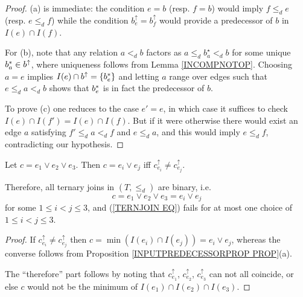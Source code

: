 \documentclass[a4paper,10pt]{article}%
\begin{document}
\begin{proof}
(a) is immediate: the condition $e = b$ (resp. $f = b$) would imply $f \leq_d e$ (resp. $e \leq_d f$)
while the condition $b^{\uparrow}_e = b^{\uparrow}_f$ would provide a predecessor of $b$ in $I(e) \cap I(f)$. 

For (b), note that any relation $a <_d b$ factors as 
$a \leq_d b^{\star}_a <_d b$ for some unique $b^{\**}_a \in b^{\uparrow}$, where uniqueness follows from Lemma \ref{INCOMPNOTOP}. Choosing $a=e$ implies $I(e) \cap b^{\uparrow} = \{b^{\**}_e\}$ and letting $a$ range over edges such that $e \leq_d a <_d b$ shows that $b^{\**}_e$ is in fact the predecessor of $b$.

To prove (c) one reduces to the case $e'=e$, in which case it suffices to check $I(e) \cap I(f') = I(e) \cap I(f)$. But if it were otherwise there would exist an edge $a$ satisfying
$f' \leq_d a <_d f$ and $e \leq_d a$, and this would imply $e \leq_d f$, contradicting our hypothesis.
\end{proof}


\begin{proposition}
\label{TERNARYJOIN PROP}
Let $c = e_1 \vee e_2 \vee e_3$.
Then $c = e_i \vee e_j$ iff $c^{\uparrow}_{e_i} \neq c^{\uparrow}_{e_j}$.

Therefore, all ternary joins in $(T,\leq_d)$ are binary, i.e.
\begin{equation}\label{TERNJOIN EQ}
	c = e_1 \vee e_2 \vee e_3 = e_i \vee e_j
\end{equation}
for some $1\leq i <j \leq 3$, and
(\ref{TERNJOIN EQ}) fails for 
 at most one choice of $1\leq i <j \leq 3$.
\end{proposition}


\begin{proof}
If $c^{\uparrow}_{e_i} \neq c^{\uparrow}_{e_j}$ then
$c = \min\left(I(e_i) \cap I(e_j)\right) = e_i \vee e_j$, whereas the converse follows from Proposition \ref{INPUTPREDECESSORPROP PROP}(a).

The ``therefore'' part follows by noting that 
$c^{\uparrow}_{e_1}$, $c^{\uparrow}_{e_2}$, $c^{\uparrow}_{e_3}$
can not all coincide, or else $c$ would not be the minimum of
$I(e_1) \cap I(e_2) \cap I(e_3)$. 
\end{proof}
\end{document}

